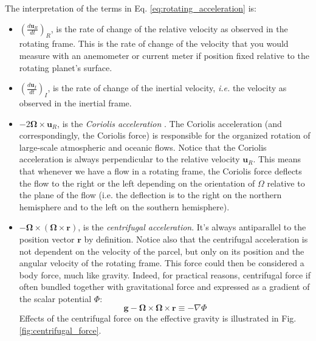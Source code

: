 \documentclass[12pt]{article}
\numberwithin{equation}{section}
\numberwithin{figure}{section}
\numberwithin{table}{section}
\begin{document}
The interpretation of the terms in Eq. \ref{eq:rotating_acceleration} is:

\begin{itemize}
  \item $\left( \frac{d \mathbf{u}_R}{dt} \right)_R$, is the rate of change of
  the relative velocity as observed in the rotating frame.
  This is the rate of change of the velocity that you would measure with an
  anemometer or current meter if position fixed relative to the rotating planet's
  surface. 

  \item $\left( \frac{d \mathbf{u}_I}{dt} \right)_I$, is the rate of change of
  the inertial velocity, \textit{i.e.} the velocity as observed in the inertial
  frame.

  \item $-2 \mathbf{\Omega} \times \mathbf{u}_R$, is the
  \textit{Coriolis acceleration}
  .
  The Coriolis acceleration (and correspondingly, the Coriolis force) is
  responsible for the organized rotation of large-scale atmospheric and oceanic
  flows.
  Notice that the Coriolis acceleration is always perpendicular to the relative
  velocity $\mathbf{u}_R$.
  This means that whenever we have a flow in a rotating frame, the Coriolis
  force deflects the flow to the right or the left depending on the orientation
  of $\Omega$ relative to the plane of the flow (i.e. the deflection is to the
  right on the northern hemisphere and to the left on the southern hemisphere).

  \item $-\mathbf{\Omega} \times \left( \mathbf{\Omega} \times \mathbf{r} \right)$,
  is the \textit{centrifugal acceleration}.
  It's always antiparallel to the position vector $\mathbf{r}$ by definition.
  Notice also that the centrifugal acceleration is not dependent on the velocity
  of the parcel, but only on its position and the angular velocity of the
  rotating frame.
  This force could then be considered a body force, much like gravity.
  Indeed, for practical reasons, centrifugal force if often bundled together
  with gravitational force and expressed as a gradient of the scalar potential
  $\Phi$:
  \begin{equation}
    \mathbf{g} - \mathbf{\Omega} \times \mathbf{\Omega} \times \mathbf{r} \equiv - \nabla \Phi
  \end{equation}
  Effects of the centrifugal force on the effective gravity is illustrated
  in Fig. \ref{fig:centrifugal_force}.

\end{itemize}
\end{document}

